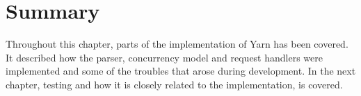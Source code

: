 \section{Summary} %
Throughout this chapter, parts of the implementation of Yarn has been covered.
It described how the parser, concurrency model and request handlers were
implemented and some of the troubles that arose during development. In the
next chapter, testing and how it is closely related to the implementation, is
covered.
